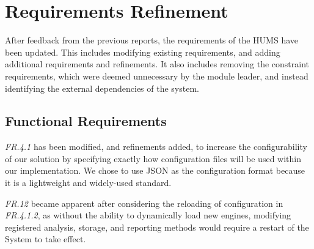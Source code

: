 \documentclass[10pt,a4paper]{article}
\begin{document}
\section{Requirements Refinement}
\label{sec:requirements}
After feedback from the previous reports, the requirements of the HUMS have been updated. This includes modifying existing requirements, and adding additional requirements and refinements. It also includes removing the constraint requirements, which were deemed unnecessary by the module leader, and instead identifying the external dependencies of the system.

\subsection{Functional Requirements}
\label{sec:functional_requirements}

\emph{FR.4.1} has been modified, and refinements added, to increase the configurability of our solution by specifying exactly how configuration files will be used within our implementation. We chose to use JSON as the configuration format because it is a lightweight and widely-used standard.

\emph{FR.12} became apparent after considering the reloading of configuration in \emph{FR.4.1.2}, as without the ability to dynamically load new engines, modifying registered analysis, storage, and reporting methods would require a restart of the System to take effect.
\end{document}
